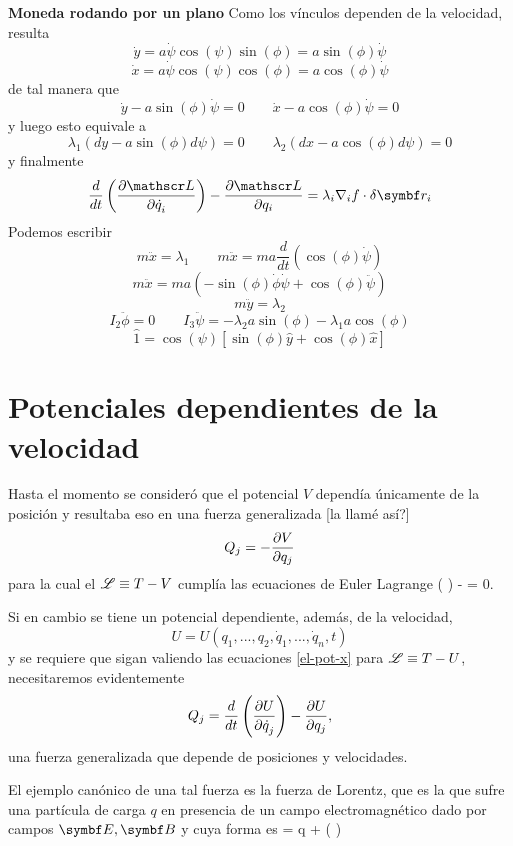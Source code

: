 \documentclass[10pt,oneside]{CBFT_book}
\begin{document}
\begin{ejemplo}{\bf Moneda rodando por un plano}
Como los vínculos dependen de la velocidad, resulta 
\[
	\dot{y} = a\dot{\psi} \cos(\psi) \sin(\phi) = a \sin(\phi) \dot{\psi}
\]
\[
	\dot{x} = a\dot{\psi} \cos(\psi) \cos(\phi) = a \cos(\phi) \dot{\psi}
\]
de tal manera que 
\[
	\dot{y} - a \sin(\phi) \dot{\psi} = 0 \qquad \dot{x} - a \cos(\phi) \dot{\psi} = 0
\]
y luego esto equivale a 
\[
	\lambda_1(dy - a \sin(\phi) d\psi) = 0 \qquad \lambda_2(dx - a \cos(\phi) d\psi)= 0
\]
y finalmente 
\[
	\frac{d}{dt}\left(\dpar{\Lag}{\dot{q}_i}\right) - \dpar{\Lag}{q_i} =
	\lambda_i \nabla_i f \cdot \delta \vb{r}_i
\]
Podemos escribir
\[
	m \ddot{x} = \lambda_1 \qquad m \ddot{x} = m a \frac{d}{dt}( \cos(\phi)\dot{\psi} )
\]
\[
	m \ddot{x} = m a ( -\sin(\phi)\dot{\phi}\dot{\psi} + \cos(\phi)\ddot{\psi} )
\]
\[
	m \ddot{y} = \lambda_2
\]
\[
	I_2\ddot{\phi} = 0 \qquad I_3\ddot{\psi} = - \lambda_2 a \sin(\phi) -\lambda_1 a \cos(\phi)
\]
\[
	\hat{1} = \cos(\psi)[\sin(\phi)\hat{y} + \cos(\phi)\hat{x}]
\]

\label{moneda}
\end{ejemplo}

\section{Potenciales dependientes de la velocidad}

Hasta el momento se consideró que el potencial $V$ dependía únicamente de la posición y resultaba eso en
una fuerza generalizada [la llamé así?]
\[
	Q_j = -\frac{\partial^{\hspace{-0.05em}} {V}}{\partial {q_j}^{\hspace{-0.05em}}}
\]
para la cual el $\mathscr{L}\equiv T-V$ cumplía las ecuaciones de Euler Lagrange
\be
	 \left(  \right) -  = 0.
	\label{el-pot-x}
\ee

Si en cambio se tiene un potencial dependiente, además, de la velocidad,
\[
	U = U(q_1, ..., q_2,\dot{q}_1,...,\dot{q}_n,t ) 
\]
y se requiere que sigan valiendo las ecuaciones \eqref{el-pot-x} para $\mathscr{L} \equiv T-U$, necesitaremos evidentemente
\[
	Q_j = \frac{d^{\hspace{-0.05em}} {}}{d {t}^{\hspace{-0.05em}}} \left( \frac{\partial^{\hspace{-0.05em}} {U}}{\partial {\dot{q}_j}^{\hspace{-0.05em}}} \right)  -\frac{\partial^{\hspace{-0.05em}} {U}}{\partial {q_j}^{\hspace{-0.05em}}},
\]
una fuerza generalizada que depende de posiciones y velocidades.

El ejemplo canónico de una tal fuerza es la fuerza de Lorentz, que es la que sufre una partícula de carga $q$ en
presencia de un campo electromagnético dado por campos $\vb{E}, \vb{B}$ y cuya forma es
\be
	 = q  +  (  \times {} )
	\label{f_lorentz}
\ee
\end{document}
